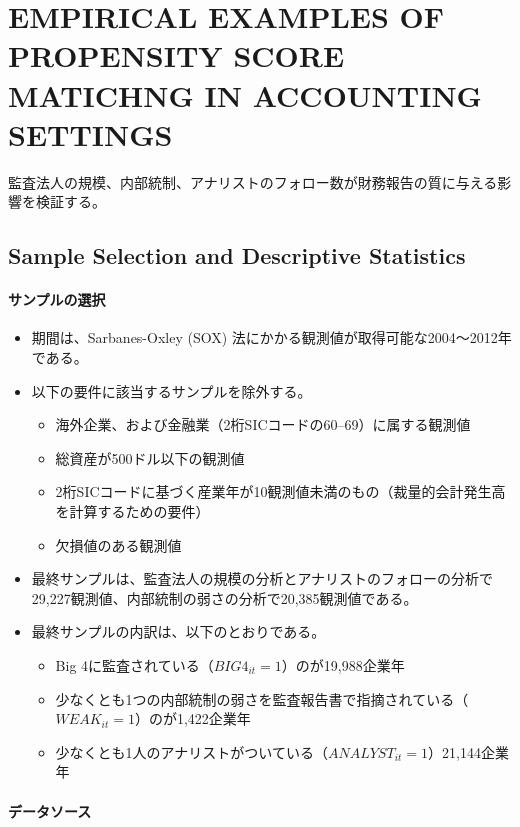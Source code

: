 \section{EMPIRICAL EXAMPLES OF PROPENSITY SCORE MATICHNG IN ACCOUNTING SETTINGS}
監査法人の規模、内部統制、アナリストのフォロー数が財務報告の質に与える影響を検証する。

\subsection*{Sample Selection and Descriptive Statistics}

\paragraph{サンプルの選択}

\begin{itemize}
 \item 期間は、Sarbanes-Oxley (SOX) 法にかかる観測値が取得可能な2004〜2012年である。
 \item 以下の要件に該当するサンプルを除外する。
   \begin{itemize}
    \item 海外企業、および金融業（2桁SICコードの60--69）に属する観測値
    \item 総資産が500ドル以下の観測値
    \item 2桁SICコードに基づく産業年が10観測値未満のもの（裁量的会計発生高を計算するための要件）
    \item 欠損値のある観測値
   \end{itemize}
 \item 最終サンプルは、監査法人の規模の分析とアナリストのフォローの分析で29,227観測値、内部統制の弱さの分析で20,385観測値である。
 \item 最終サンプルの内訳は、以下のとおりである。
    \begin{itemize}
    \item Big 4に監査されている（$\mathit{BIG}4_{it}=1$）のが19,988企業年
    \item 少なくとも1つの内部統制の弱さを監査報告書で指摘されている（$\mathit{WEAK}_{it}=1$）のが1,422企業年
    \item 少なくとも1人のアナリストがついている（$\mathit{ANALYST}_{it}=1$）21,144企業年
   \end{itemize}
\end{itemize}

\paragraph{データソース}

